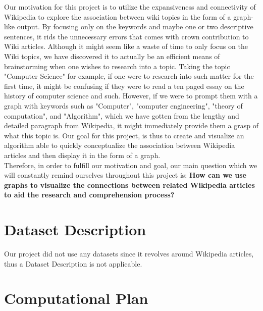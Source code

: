 \documentclass[fontsize=11pt]{article}
\begin{document}
Our motivation for this project is to utilize the expansiveness and connectivity of Wikipedia to explore the association between wiki topics in the form of a graph-like output. By focusing only on the keywords and maybe one or two descriptive sentences, it rids the unnecessary errors that comes with crown contribution to Wiki articles. Although it might seem like a waste of time to only focus on the Wiki topics, we have discovered it to actually be an efficient means of brainstorming when one wishes to research into a topic. Taking the topic "Computer Science" for example, if one were to research into such matter for the first time, it might be confusing if they were to read a ten paged essay on the history of computer science and such. However, if we were to prompt them with a graph with keywords such as "Computer", "computer engineering", "theory of computation", and "Algorithm", which we have gotten from the lengthy and detailed paragraph from Wikipedia, it might immediately provide them a grasp of what this topic is. Our goal for this project, is thus to create and visualize an algorithm able to quickly conceptualize the association between Wikipedia articles and then display it in the form of a graph. \\

Therefore, in order to fulfill our motivation and goal, our main question which we will constantly remind ourselves throughout this project is: 
\textbf{How can we use graphs to visualize the connections between related Wikipedia articles to aid the research and comprehension process?}


\section*{Dataset Description}

\qquad Our project did not use any datasets since it revolves around Wikipedia articles, thus a Dataset Description is not applicable.

\section*{Computational Plan}
\end{document}
